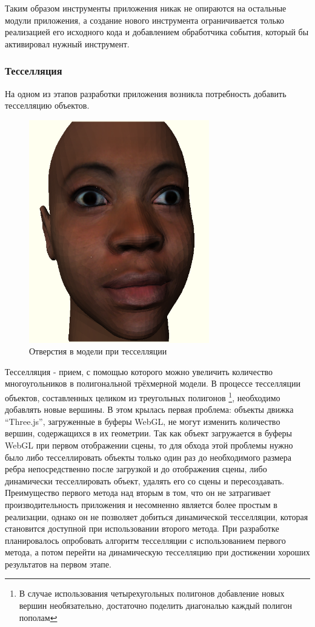 \documentclass[14pt, a4paper]{extarticle}
\begin{document}
Таким образом инструменты приложения никак не опираются на остальные
модули приложения, а создание нового инструмента ограничивается только
реализацией его исходного кода и добавлением обработчика события, который бы
активировал нужный инструмент.

\subsubsection{Тесселляция}

На одном из этапов разработки приложения возникла потребность добавить
тесселляцию объектов.

\begin{figure}[htb]
\centering
\includegraphics[width=0.7\textwidth]{holes-in-model.png}
\caption{Отверстия в модели при тесселляции}
\label{fig:holes-in-model}
\end{figure}

Тесселляция - прием, с помощью которого можно увеличить количество
многоугольников в полигональной трёхмерной модели. В процессе тесселляции
объектов, составленных целиком из треугольных полигонов \footnote{В случае
использования четырехугольных полигонов добавление новых вершин необязательно,
достаточно поделить диагональю каждый полигон пополам}, необходимо добавлять
новые вершины. В этом крылась первая проблема: объекты движка ``Three.js'',
загруженные в буферы WebGL, не могут изменить количество вершин, содержащихся в
их геометрии. Так как объект загружается в буферы WebGL при первом отображении
сцены, то для обхода этой проблемы нужно было либо тесселлировать объекты только
один раз до необходимого размера ребра непосредственно после загрузкой и до
отображения сцены, либо динамически тесселлировать объект, удалять его со сцены
и пересоздавать. Преимущество первого метода над вторым в том, что он не
затрагивает производительность приложения и несомненно является более простым в
реализации, однако он не позволяет добиться динамической тесселляции, которая
становится доступной при использовании второго метода. При разработке
планировалось опробовать алгоритм тесселляции с использованием первого метода, а
потом перейти на динамическую тесселляцию при достижении хороших результатов на
первом этапе.
\end{document}
